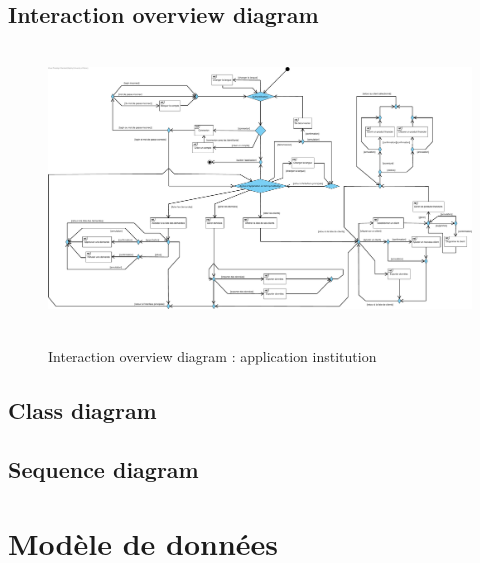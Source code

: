 \documentclass[]{report}
\begin{document}
\newpage

\subsection{Interaction overview diagram}



\vspace{2.5cm}
\begin{figure}[h!]
\hbox{
	\centering\includegraphics[width=\linewidth]{img/Interaction Overview Institution.pdf}
}
\caption{Interaction overview diagram : application institution}
\end{figure}

\newpage

\subsection{Class diagram}



\newpage

\subsection{Sequence diagram}


\newpage

\section{Modèle de données}
\end{document}
